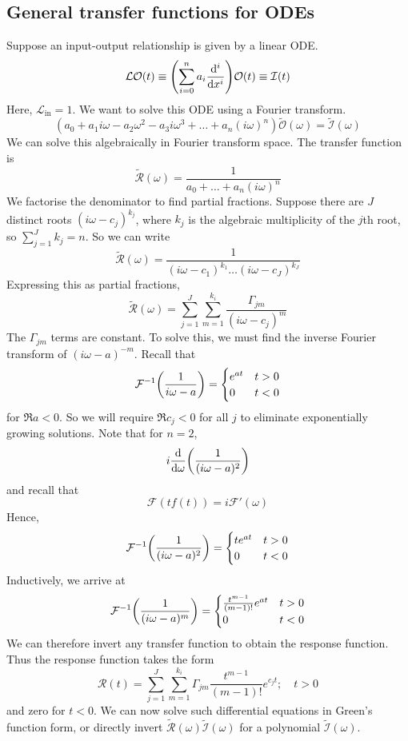 \subsection{General transfer functions for ODEs}
Suppose an input-output relationship is given by a linear ODE.\@
\[
	\mathcal L \mathcal O(t) \equiv \qty(\sum_{i=0}^n a_i \dv[i]{x}) \mathcal O(t) \equiv \mathcal I(t)
\]
Here, \( \mathcal L_{\text{in}} = 1 \).
We want to solve this ODE using a Fourier transform.
\[
	(a_0 + a_1 i\omega - a_2 \omega^2 - a_3 i\omega^3 + \dots + a_n (i \omega)^n) \widetilde{\mathcal O}(\omega) = \widetilde{\mathcal I}(\omega)
\]
We can solve this algebraically in Fourier transform space.
The transfer function is
\[
	\widetilde{\mathcal R}(\omega) = \frac{1}{a_0 + \dots + a_n (i \omega)^n}
\]
We factorise the denominator to find partial fractions.
Suppose there are \( J \) distinct roots \( (i \omega - c_j)^{k_j} \), where \( k_j \) is the algebraic multiplicity of the \( j \)th root, so \( \sum_{j=1}^J k_j = n \).
So we can write
\[
	\widetilde{\mathcal R}(\omega) = \frac{1}{(i \omega - c_1)^{k_1} \dots (i \omega - c_J)^{k_J}}
\]
Expressing this as partial fractions,
\[
	\widetilde{\mathcal R}(\omega) = \sum_{j=1}^J \sum_{m=1}^{k_i} \frac{\Gamma_{jm}}{(i\omega - c_j)^m}
\]
The \( \Gamma_{jm} \) terms are constant.
To solve this, we must find the inverse Fourier transform of \( (i\omega - a)^{-m} \).
Recall that
\[
	\mathcal F^{-1}\qty(\frac{1}{i\omega - a}) = \begin{cases}
		e^{at} & t > 0 \\
		0      & t < 0
	\end{cases}
\]
for \( \Re a < 0 \).
So we will require \( \Re c_j < 0 \) for all \( j \) to eliminate exponentially growing solutions.
Note that for \( n = 2 \),
\[
	i \dv{\omega} \qty(\frac{1}{(i \omega - a)^2})
\]
and recall that
\[
	\mathcal F (t f(t)) = i \mathcal F'(\omega)
\]
Hence,
\[
	\mathcal F^{-1}\qty(\frac{1}{(i \omega - a)^2}) = \begin{cases}
		t e^{at} & t > 0 \\
		0        & t < 0
	\end{cases}
\]
Inductively, we arrive at
\[
	\mathcal F^{-1}\qty(\frac{1}{(i \omega - a)^m}) = \begin{cases}
		\frac{t^{m-1}}{(m-1)!} e^{at} & t > 0 \\
		0                             & t < 0
	\end{cases}
\]
We can therefore invert any transfer function to obtain the response function.
Thus the response function takes the form
\[
	\mathcal R(t) = \sum_{j=1}^J \sum_{m=1}^{k_i} \Gamma_{jm} \frac{t^{m-1}}{(m-1)!} e^{c_j t};\quad t > 0
\]
and zero for \( t < 0 \).
We can now solve such differential equations in Green's function form, or directly invert \( \widetilde{\mathcal R}(\omega) \widetilde{\mathcal I}(\omega) \) for a polynomial \( \widetilde{\mathcal I}(\omega) \).


